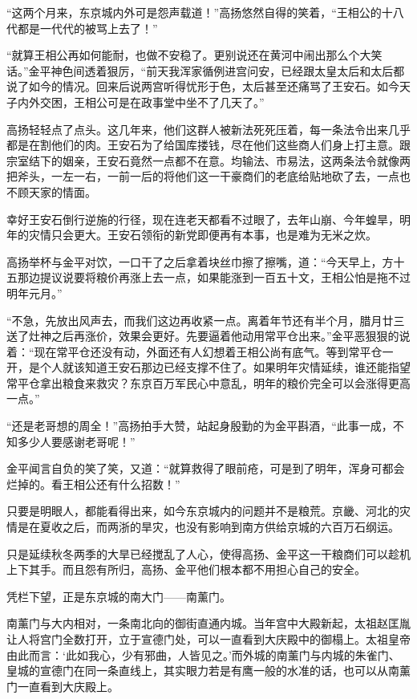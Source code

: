 “这两个月来，东京城内外可是怨声载道！”高扬悠然自得的笑着，“王相公的十八代都是一代代的被骂上去了！”

“就算王相公再如何能耐，也做不安稳了。更别说还在黄河中闹出那么个大笑话。”金平神色间透着狠厉，“前天我浑家循例进宫问安，已经跟太皇太后和太后都说了如今的情况。回来后说两宫听得忧形于色，太后甚至还痛骂了王安石。如今天子内外交困，王相公可是在政事堂中坐不了几天了。”

高扬轻轻点了点头。这几年来，他们这群人被新法死死压着，每一条法令出来几乎都是在割他们的肉。王安石为了给国库搂钱，尽在他们这些商人们身上打主意。跟宗室结下的姻亲，王安石竟然一点都不在意。均输法、市易法，这两条法令就像两把斧头，一左一右，一前一后的将他们这一干豪商们的老底给贴地砍了去，一点也不顾天家的情面。

幸好王安石倒行逆施的行径，现在连老天都看不过眼了，去年山崩、今年蝗旱，明年的灾情只会更大。王安石领衔的新党即便再有本事，也是难为无米之炊。

高扬举杯与金平对饮，一口干了之后拿着块丝巾擦了擦嘴，道：“今天早上，方十五那边提议说要将粮价再涨上去一点，如果能涨到一百五十文，王相公怕是拖不过明年元月。”

“不急，先放出风声去，而我们这边再收紧一点。离着年节还有半个月，腊月廿三送了灶神之后再涨价，效果会更好。先要逼着他动用常平仓出来。”金平恶狠狠的说着：“现在常平仓还没有动，外面还有人幻想着王相公尚有底气。等到常平仓一开，是个人就该知道王安石那边已经支撑不住了。如果明年灾情延续，谁还能指望常平仓拿出粮食来救灾？东京百万军民心中意乱，明年的粮价完全可以会涨得更高一点。”

“还是老哥想的周全！”高扬拍手大赞，站起身殷勤的为金平斟酒，“此事一成，不知多少人要感谢老哥呢！”

金平闻言自负的笑了笑，又道：“就算救得了眼前疮，可是到了明年，浑身可都会烂掉的。看王相公还有什么招数！”

只要是明眼人，都能看得出来，如今东京城内的问题并不是粮荒。京畿、河北的灾情是在夏收之后，而两浙的旱灾，也没有影响到南方供给京城的六百万石纲运。

只是延续秋冬两季的大旱已经搅乱了人心，使得高扬、金平这一干粮商们可以趁机上下其手。而且怨有所归，高扬、金平他们根本都不用担心自己的安全。

凭栏下望，正是东京城的南大门——南薰门。

南薰门与大内相对，一条南北向的御街直通内城。当年宫中大殿新起，太祖赵匡胤让人将宫门全数打开，立于宣德门处，可以一直看到大庆殿中的御榻上。太祖皇帝由此而言：‘此如我心，少有邪曲，人皆见之。’而外城的南薰门与内城的朱雀门、皇城的宣德门在同一条直线上，其实眼力若是有鹰一般的水准的话，也可以从南薰门一直看到大庆殿上。

